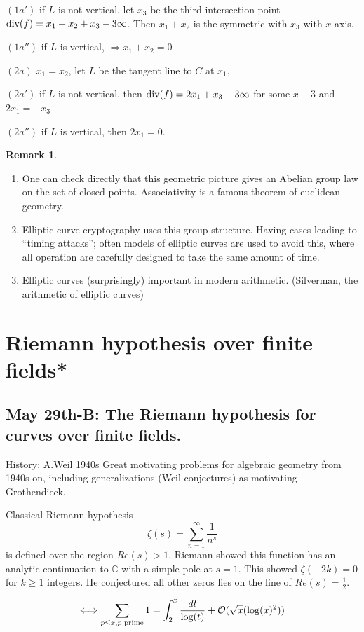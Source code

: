 \documentclass[11pt]{article}
\theoremstyle{definition}
\newtheorem{rmk}[thm]{Remark}
\newcommand{\cplx}{\mathbb C}
\newcommand{\calo}{{\cal O}}
\renewcommand{\div}{\textnormal{div}}
\newcommand{\Lrta}{\Longrightarrow}
\newcommand{\Llrta}{\Longleftrightarrow}
\begin{document}
$(1a')$ if $L$ is not vertical, let $x_3$
 be the third  intersection point $\div(f)=x_1+x_2+x_3-3\infty$. Then $x_1+x_2$ is the symmetric with $x_3$ with $x$-axis.

 $(1a'')$ if $L$ is vertical, $\Lrta x_1+x_2=0$

$(2a)$ $x_1=x_2$, let $L$ be the tangent line to $C$ at $x_1$, 

$(2a')$ if $L$ is not vertical, then $\div(f)=2x_1+x_3-3\infty$ for some $x-3$ and $2x_1=-x_3$

$(2a'')$
 if $L$ is vertical, then $2x_1=0$.

\begin{rmk}\ 
\begin{enumerate}[label=(\arabic*)]
\item One can check directly that this geometric picture gives an Abelian group law on the set of closed points. Associativity is a famous theorem of euclidean geometry.
\item Elliptic curve cryptography uses this group structure. Having cases leading to ``timing attacks''; often models of elliptic curves are used to avoid this, where all operation are carefully designed to take the same amount of time.
\item Elliptic curves (surprisingly) important in modern arithmetic. (Silverman, the arithmetic of elliptic curves)
\end{enumerate}
\end{rmk}
\section{Riemann hypothesis over finite fields*}
\subsection{May 29th-B: The Riemann hypothesis for curves over finite fields.}

\underline{History:} A.Weil 1940s Great motivating problems for algebraic geometry from 1940s on, including generalizations
(Weil conjectures) as motivating Grothendieck.

Classical Riemann hypothesis
$$
\zeta(s)=\sum_{n=1}^\infty \frac{1}{n^s}
$$
is defined over the region $Re(s)>1$. Riemann showed this function has an analytic continuation to $\cplx$ with a simple pole at $s=1$. This showed $\zeta(-2k)=0$ for $k\geq 1$ integers. He conjectured all other zeros lies on the line of $Re(s)=\frac{1}{2}$.

$$\Llrta\sum_{p\leq x, p\text{ prime}}1=\int^x_2\frac{dt}{\log(t)}+\calo(\sqrt{x}(\log(x)^2))$$
\end{document}
